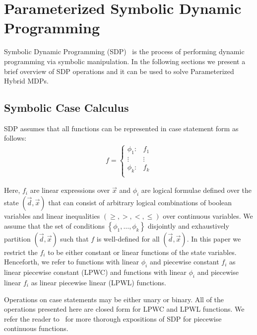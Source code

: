 \section{Parameterized Symbolic Dynamic Programming}
\label{sec:sdp}

Symbolic Dynamic Programming (SDP)~\parencite{Boutilier_IJCAI_2001} is the process of performing dynamic programming via symbolic manipulation. In the following sections we present a brief overview of SDP operations and it can be used to solve Parameterized Hybrid MDPs.

\subsection{Symbolic Case Calculus}

SDP assumes that all functions can be represented in case statement form \parencite{Boutilier_IJCAI_2001} as follows:
{\footnotesize 
    \abovedisplayskip=5pt
    \belowdisplayskip=0pt
    \begin{align*}
        f = 
        \begin{cases}
            \phi_1: & f_1 \\ 
            \vdots & \vdots\\ 
            \phi_k: & f_k \\ 
        \end{cases}
    \end{align*}
}%

Here, {\footnotesize$ f_i $} are linear expressions over {\footnotesize$ \vec{x} $} and {\footnotesize$\phi_i$} are logical formulae defined over the state {\footnotesize$( \vec{d}, \vec{x})$} that can consist of arbitrary logical combinations of boolean variables and linear inequalities {\footnotesize$\left( \geq, >, <, \leq \right)$} over continuous variables. We assume that the set of conditions {\footnotesize$\left\lbrace \phi_1, \ldots, \phi_k \right\rbrace$} disjointly and exhaustively partition {\footnotesize$(\vec{d}, \vec{x})$} such that {\footnotesize$f$} is well-defined for all {\footnotesize$(\vec{d}, \vec{x})$}. In this paper we restrict the {\footnotesize$f_i$} to be either constant or linear functions of the state variables. Henceforth, we refer to functions with linear {\footnotesize$\phi_i$} and piecewise constant {\footnotesize$f_i$} as linear piecewise constant (LPWC) and functions with linear {\footnotesize$\phi_i$} and piecewise linear {\footnotesize$f_i$} as linear piecewise linear (LPWL) functions.

Operations on case statements may be either unary or binary. All of the operations presented here are closed form for LPWC and LPWL functions. We refer the reader to~\parencite{Sanner_UAI_2011,Zamani_AAAI_2012} for more thorough expositions of SDP for piecewise continuous functions.

